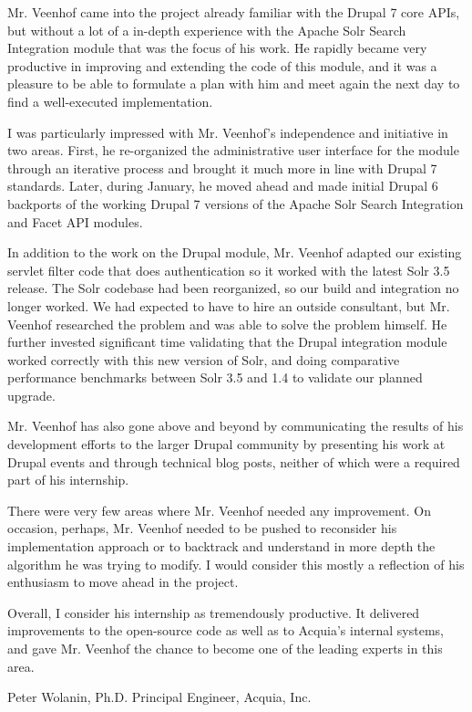 Mr. Veenhof came into the project already familiar with the Drupal 7
core APIs, but without a lot of a in-depth experience with the Apache
Solr Search Integration module that was the focus of his work. He
rapidly became very productive in improving and extending the code of
this module, and it was a pleasure to be able to formulate a plan with
him and meet again the next day to find a well-executed
implementation.

I was particularly impressed with Mr. Veenhof's independence and
initiative in two areas.  First, he re-organized the administrative
user interface for the module through an iterative process and brought
it much more in line with Drupal 7 standards. Later, during January,
he moved ahead and made initial Drupal 6 backports of the working
Drupal 7 versions of the Apache Solr Search Integration and Facet API
modules.

In addition to the work on the Drupal module, Mr. Veenhof adapted our
existing servlet filter code that does authentication so it worked
with the latest Solr 3.5 release.  The Solr codebase had been
reorganized, so our build and integration no longer worked.  We had
expected to have to hire an outside consultant, but Mr. Veenhof
researched the problem and was able to solve the problem himself. He
further invested significant time validating that the Drupal
integration module worked correctly with this new version of Solr, and
doing comparative performance benchmarks between Solr 3.5 and 1.4 to
validate our planned upgrade.

Mr. Veenhof has also gone above and beyond by communicating the
results of his development efforts to the larger Drupal community by
presenting his work at Drupal events and through technical blog posts,
neither of which were a required part of his internship.

There were very few areas where Mr. Veenhof needed any improvement.
On occasion, perhaps, Mr. Veenhof needed to be pushed to reconsider
his implementation approach or to backtrack and understand in more
depth the algorithm he was trying to modify.  I would consider this
mostly a reflection of his enthusiasm to move ahead in the project.

Overall, I consider his internship as tremendously productive. It
delivered improvements to the open-source code as well as to Acquia's
internal systems, and gave Mr. Veenhof the chance to become one of the
leading experts in this area.

Peter Wolanin, Ph.D.
Principal Engineer, Acquia, Inc.